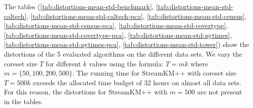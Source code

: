 The tables 
(\cref{tab:distortions-mean-std-benchmark},
 \cref{tab:distortions-mean-std-caltech},
 \cref{tab:distortions-mean-std-caltech-pca},
 \cref{tab:distortions-mean-std-census},
 \cref{tab:distortions-mean-std-census-pca},
 \cref{tab:distortions-mean-std-covertype},
 \cref{tab:distortions-mean-std-covertype-pca},
 \cref{tab:distortions-mean-std-nytimes},
 \cref{tab:distortions-mean-std-nytimes-pca},
 \cref{tab:distortions-mean-std-tower})
show the distortions of the 5 evaluated algorithms on the different data sets.
We vary the coreset size $T$ for different $k$ values using the formula: $T=mk$ where $m = \{50, 100, 200, 500\}$.
The running time for StreamKM++ with coreset size $T=500k$ exceeds the allocated time budget of 32 hours on almost all data sets.
For this reason, the distortions for StreamKM++ with $m=500$ are not present in the tables.



